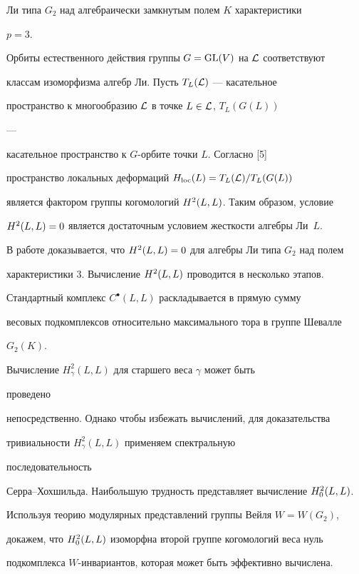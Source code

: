 Ли типа $G_2$ над алгебраически замкнутым полем $K$ характеристики 


$p=3$. 


 


Орбиты естественного действия группы $G=\operatorname{GL}(V)$ на ${\cal L}$ соответствуют 


классам изоморфизма алгебр Ли. Пусть $T_L({\cal L})$ --- касательное 


пространство к многообразию ${\cal L}$ в точке $L\in {\cal L}$, $T_{L}(G(L))$ 


--- 


касательное пространство к $G$-орбите точки $L$. Согласно [5] 


пространство локальных деформаций $H_{\operatorname{loc}}(L)=T_{L}({\cal L})/T_L (G(L))$ 


является фактором группы когомологий $H^2(L,L)$. Таким образом, условие 


$H^2(L,L) =0$ является достаточным условием жесткости алгебры Ли~$L$. 


В работе доказывается, что $H^2(L,L) =0$ для алгебры Ли типа $G_2$ над полем 


характеристики 3. Вычисление $H^2(L,L)$ проводится в несколько этапов. 


Стандартный комплекс $C^{\bullet} (L,L)$ раскладывается в прямую сумму 


весовых подкомплексов относительно максимального тора в группе Шевалле 


$G_2(K)$. 


 


Вычисление $H^2_{\gamma}(L,L)$ для старшего веса $\gamma$ может быть 


проведено 


непосредственно. Однако чтобы избежать вычислений, для доказательства 


тривиальности $H^2_{\gamma}(L,L)$ применяем спектральную 


последовательность 


Серра--Хохшильда. Наибольшую трудность представляет вычисление $H^2_0(L,L)$. 


Используя теорию модулярных представлений группы Вейля $W=W(G_2)$, 


докажем, что $H^2_0(L,L)$ изоморфна второй группе когомологий веса нуль 


подкомплекса $W$-инвариантов, которая может быть эффективно вычислена. 





